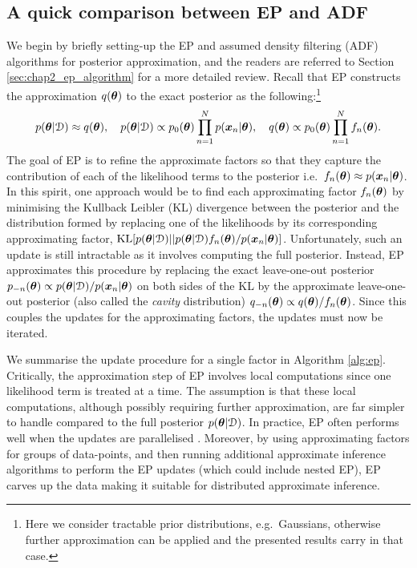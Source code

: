 \subsection{A quick comparison between EP and ADF}
We begin by briefly setting-up the EP and assumed density filtering (ADF) algorithms for posterior approximation, and the readers are referred to Section \ref{sec:chap2_ep_algorithm} for a more detailed review. Recall that EP constructs the approximation $q(\bm{\theta})$ to the exact posterior as the following:\footnote{Here we consider tractable prior distributions, e.g.~Gaussians, otherwise further approximation can be applied and the presented results carry in that case. } 
\begin{equation}
p(\bm{\theta} | \mathcal{D}) \approx q(\bm{\theta}), \quad p(\bm{\theta} | \mathcal{D}) \propto p_0(\bm{\theta}) \prod_{n=1}^{N} p(\bm{x}_n | \bm{\theta}), \quad q(\bm{\theta}) \propto p_0(\bm{\theta}) \prod_{n=1}^{N} f_n(\bm{\theta}).
\end{equation}
%
The goal of EP is to refine the approximate factors so that they capture the contribution of each of the likelihood terms to the posterior i.e.~$f_n(\bm{\theta}) \approx p(\bm{x}_n | \bm{\theta})$. In this spirit, one approach would be to find each approximating factor $f_n(\bm{\theta})$ by minimising the Kullback Leibler (KL) divergence between the posterior and the distribution formed by replacing one of the likelihoods by its corresponding approximating factor,  $\mathrm{KL}[p(\bm{\theta}|\mathcal{D}) || p(\bm{\theta}|\mathcal{D}) f_n(\bm{\theta})/ p(\bm{x}_n | \bm{\theta})]$. Unfortunately, such an update is still intractable as it involves computing the full posterior. Instead, EP approximates this procedure by replacing the exact leave-one-out posterior $p_{-n}(\bm{\theta}) \propto p(\bm{\theta}|\mathcal{D}) / p(\bm{x}_n | \bm{\theta})$ on both sides of the KL by the approximate leave-one-out posterior (also called the \emph{cavity} distribution) $q_{-n}(\bm{\theta}) \propto q(\bm{\theta})/f_n(\bm{\theta})$. Since this couples the updates for the approximating factors, the updates must now be iterated.

We summarise the update procedure for a single factor in Algorithm \ref{alg:ep}. Critically, the approximation step of EP involves local computations since one likelihood term is treated at a time. The assumption is that these local computations, although possibly requiring further approximation, are far simpler to handle compared to the full posterior $p(\bm{\theta}| \mathcal{D})$. In practice, EP often performs well when the updates are parallelised \citep{microsoft:infernet2014}. Moreover, by using approximating factors for groups of data-points, and then running additional approximate inference algorithms to perform the EP updates (which could include nested EP), EP carves up the data making it suitable for distributed approximate inference.


